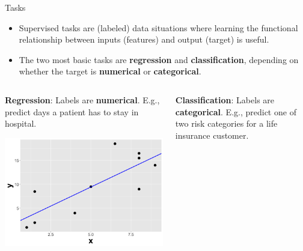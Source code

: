 \documentclass[11pt,compress,t,notes=noshow, xcolor=table]{beamer}
\begin{document}
\begin{vbframe}{Tasks}
\begin{itemize}
    \item Supervised tasks are (labeled) data situations where learning the functional
        relationship between inputs (features) and output (target) is
        useful.
    
    \item The two most basic tasks are 
        \textbf{regression} and \textbf{classification}, depending on whether the 
        target is \textbf{numerical} or \textbf{categorical}. 
\end{itemize}  

\lz

\begin{columns}    
\begin{column}{0.4\textwidth} 
\small \textbf{Regression}: Labels are \textbf{numerical}. E.g., predict days a patient has to stay in hospital.

  \begin{center}
    \includegraphics[width=\textwidth]{slides/ml-basics/figure_man/nutshell-ml-basics-supervised-regression-task.png} 
  \end{center}
\end{column}    

\begin{column}{0.4\textwidth} 
\small \textbf{Classification}: Labels are \textbf{categorical}. E.g., predict one of two risk categories for a life insurance customer. 
  

\end{column}
\end{columns}
\end{vbframe}
\end{document}

